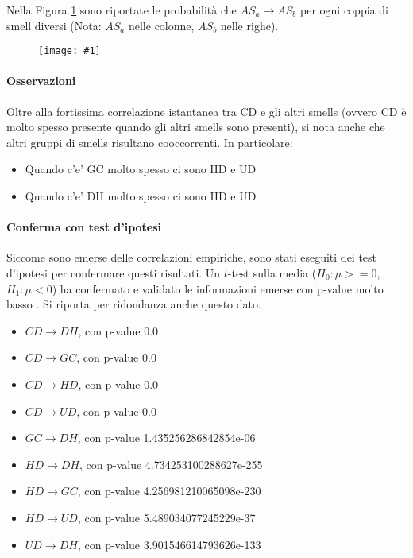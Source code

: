 \documentclass[a4paper,11pt,oneside, table]{article}
\newcommand{\putimage}[4] {
  \begin{figure}[H]
    \centering
    \texttt{[image: \#1]}
    \caption{#2}\label{#3}
  \end{figure}
}
\begin{document}
  Nella Figura \ref{png:instants} sono riportate le probabilit\`a che $AS_{a} \rightarrow AS_{b}$ per ogni coppia di smell diversi (Nota: $AS_{a}$ nelle colonne, $AS_{b}$ nelle righe).
  
  \putimage{images/instants.png}{}{png:instants}{0.5}

  \paragraph{Osservazioni}
  Oltre alla fortissima correlazione istantanea tra CD e gli altri smells (ovvero CD \`e molto spesso presente quando gli altri smells sono presenti), si nota anche che altri gruppi di smells risultano cooccorrenti. In particolare:

  \begin{itemize}
    \item Quando c'e' GC molto spesso ci sono HD e UD
    \item Quando c'e' DH molto spesso ci sono HD e UD
  \end{itemize}

  \paragraph{Conferma con test d'ipotesi}

  Siccome sono emerse delle correlazioni empiriche, sono stati eseguiti dei test d'ipotesi per confermare questi risultati. Un $t$-test \cite{sun2020microbiome} sulla media ($H_0: \mu >= 0$, $H_1: \mu < 0$) ha confermato e validato le informazioni emerse con p-value molto basso \cite{head2015extent}. Si riporta per ridondanza anche questo dato.

  \begin{itemize}
    \item $CD \rightarrow DH$, con p-value 0.0
    \item $CD \rightarrow GC$, con p-value 0.0
    \item $CD \rightarrow HD$, con p-value 0.0
    \item $CD \rightarrow UD$, con p-value 0.0
    \item $GC \rightarrow DH$, con p-value 1.435256286842854e-06
    \item $HD \rightarrow DH$, con p-value 4.734253100288627e-255
    \item $HD \rightarrow GC$, con p-value 4.256981210065098e-230
    \item $HD \rightarrow UD$, con p-value 5.489034077245229e-37
    \item $UD \rightarrow DH$, con p-value 3.901546614793626e-133
  \end{itemize}
\end{document}
